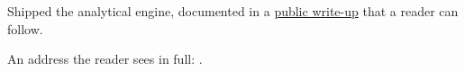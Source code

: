 \documentclass[medium=screen]{careerdossier-resume}
\begin{document}
\MakeCDossierHeader
{}
\begin{CDossierEntry}[
  title={Engineer},
  organization={Example Labs},
  location={Toronto},
  dates={2024--2026}
]
\begin{CDossierItemize}
  \item Shipped the analytical engine, documented in a
        \href{https://example.test/work}{public write-up} that a reader
        can follow.
  \item An address the reader sees in full:
        .
\end{CDossierItemize}
\end{CDossierEntry}
\end{document}
